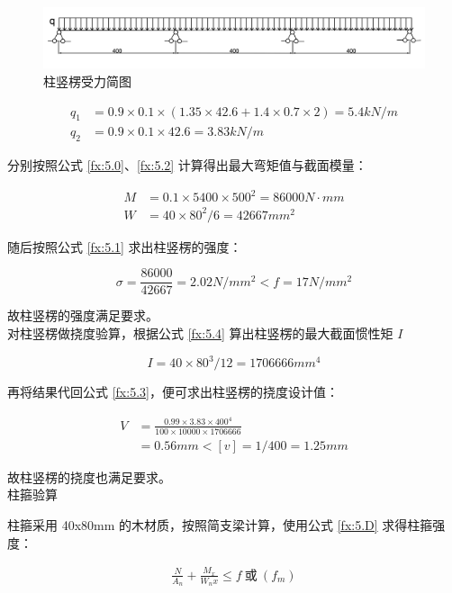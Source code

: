 \begin{figure}[thbp!]
    \centering
    \includegraphics[width=1.0\linewidth]{figure/c5f7.png}
    \caption{柱竖楞受力简图}
    \label{fig:c5f7}
\end{figure}

\begin{align*}
    q_1&=0.9\times 0.1\times(1.35\times 42.6+1.4\times 0.7\times 2)=5.4 kN/m\\
    q_2&=0.9\times 0.1\times 42.6=3.83 kN/m
\end{align*}

分别按照公式 \ref{fx:5.0}、\ref{fx:5.2} 计算得出最大弯矩值与截面模量：

\begin{align*}
    M&=0.1\times 5400\times 500^2=86000 N \cdot mm\\
    W&=40\times 80^2 /6=42667 mm^2
\end{align*}

随后按照公式 \ref{fx:5.1} 求出柱竖楞的强度：

\[
    \sigma = \frac{86000}{42667}=2.02 N/mm^2< f=17N/mm^2
\]

故柱竖楞的强度满足要求。\\

对柱竖楞做挠度验算，根据公式 \ref{fx:5.4} 算出柱竖楞的最大截面惯性矩 $I$

\[
    I=40\times 80^3 /12=1706666 mm^4
\]

再将结果代回公式 \ref{fx:5.3}，便可求出柱竖楞的挠度设计值：

\begin{align*}
    V&=\frac{0.99\times 3.83 \times 400^4}{100\times 10000\times 1706666}\\
    &=0.56 mm<[v]=1/400=1.25mm
\end{align*}

故柱竖楞的挠度也满足要求。\\

 柱箍验算

柱箍采用 40x80mm 的木材质，按照简支梁计算，使用公式 \ref{fx:5.D} 求得柱箍强度：

\begin{align}
    \label{fx:5.D}
    \frac{N}{A_n}+\frac{M_x}{W_nx}\leq f \ \text{或} \ (f_m)
\end{align}

